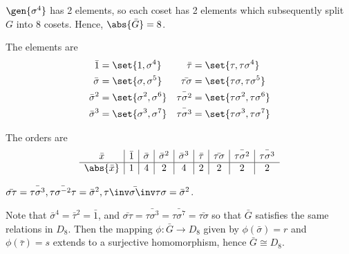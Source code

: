 \begin{solenum}
    \item $\gen{\sigma^4}$ has 2 elements, so each coset has 2 elements which subsequently split $G$ into 8 cosets.
	Hence, $\abs{\bar G} = 8$.
    \item The elements are
    \begin{align*}
        \bar 1 & = \set{1, \sigma^4} & \bar\tau & = \set{\tau, \tau\sigma^4} \\
        \bar\sigma & = \set{\sigma, \sigma^5} & \bar{\tau\sigma} & = \set{\tau\sigma, \tau\sigma^5} \\
        \bar\sigma^2 & = \set{\sigma^2, \sigma^6} & \bar{\tau\sigma^2} & = \set{\tau\sigma^2, \tau\sigma^6} \\
        \bar\sigma^3 & = \set{\sigma^3, \sigma^7} & \bar{\tau\sigma^3} & = \set{\tau\sigma^3, \tau\sigma^7}
    \end{align*}
    \item The orders are
    \[
        \begin{array}{c|c|c|c|c|c|c|c|c}
            \bar x & \bar 1 & \bar\sigma & \bar\sigma^2 & \bar\sigma^3 & \bar\tau & \bar{\tau\sigma} & \bar{\tau\sigma^2} & \bar{\tau\sigma^3} \\
            \hline
            \abs{\bar x} & 1 & 4 & 2 & 4 & 2 & 2 & 2 & 2
        \end{array}
    \]
    \item $\bar{\sigma\tau} = \bar{\tau\sigma^3}, \bar{\tau\sigma^{-2}\tau} = \bar\sigma^2, \bar{\tau\inv\sigma\inv\tau\sigma} = \bar\sigma^2$.
    \item Note that $\bar\sigma^4 = \bar\tau^2 = \bar 1$, and $\bar{\sigma\tau} = \bar{\tau\sigma^3} = \bar{\tau\sigma^7} = \bar{\tau\sigma}$ so that $\bar G$ satisfies the same relations in $D_8$.
	Then the mapping $\phi : \bar G \to D_8$ given by $\phi(\bar\sigma) = r$ and $\phi(\bar\tau) = s$ extends to a surjective homomorphism, hence $\bar G \cong D_8$.
\end{solenum}

